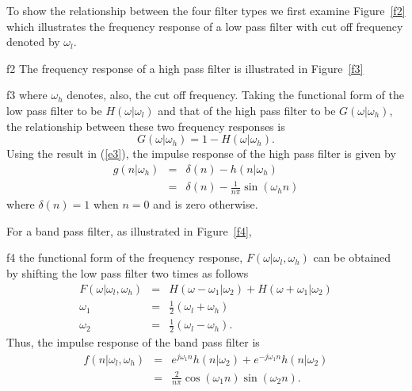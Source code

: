 To show the relationship between the four filter types we
first examine Figure~\ref{f2} which illustrates the frequency
response of a low pass filter with cut off frequency denoted
by $\omega_l$.
%

{f2}
%
The frequency response of a 
high pass filter is illustrated in Figure~\ref{f3}
%

{f3}
%
where $\omega_h$ denotes, also, the cut off frequency.
Taking the functional form of the low pass filter to be
$H(\omega|\omega_l)$ and that of the high pass filter
to be $G(\omega|\omega_h)$, the relationship between
these two frequency responses is 
%
\begin{equation}
G(\omega|\omega_h)=1-H(\omega|\omega_h).
\label{e5}
\end{equation}
%
Using the result in (\ref{e3}), the impulse response of the high pass
filter is given by
%
\begin{eqnarray}
g(n|\omega_h) &=& \delta(n)-h(n|\omega_h) \\
              &=& \delta(n)-\frac{1}{n\pi}\sin(\omega_hn)
\label{e6}
\end{eqnarray}
%
where $\delta(n)=1$ when $n=0$ and is zero otherwise.

For a band pass filter, as illustrated in 
Figure~\ref{f4},
%

{f4}
%
the functional form of the frequency response,
$F(\omega|\omega_l,\omega_h)$ can be obtained by shifting the
low pass filter two times as follows
%
\begin{eqnarray}
F(\omega|\omega_l,\omega_h) &=& H(\omega-\omega_1|\omega_2)+H(\omega+\omega_1|\omega_2)\\
                  \omega_1  &=& \frac{1}{2}(\omega_l+\omega_h)\\
                  \omega_2  &=& \frac{1}{2}(\omega_l-\omega_h).
\label{e7}
\end{eqnarray}
%
Thus, the impulse response of the band pass filter is
%
\begin{eqnarray}
f(n|\omega_l,\omega_h) &=& e^{j\omega_1n}h(n|\omega_2)+e^{-j\omega_1n}h(n|\omega_2) \\
                       &=& \frac{2}{n\pi}\cos(\omega_1n)\sin(\omega_2n).
\label{e8}
\end{eqnarray}
%

